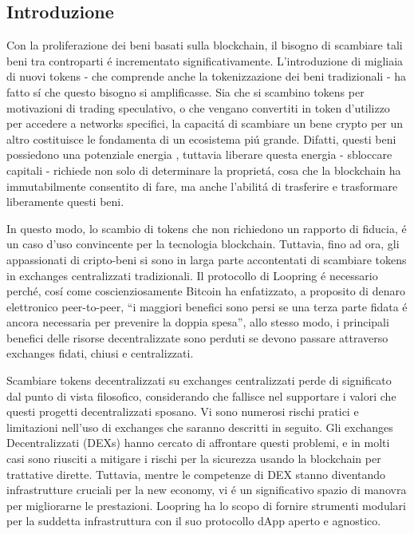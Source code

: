 \documentclass[UTF8,nofonts]{article}
\begin{document}
\begin{multicols}{2}
\section{Introduzione\label{sec:introduction}}

 Con la proliferazione dei beni  basati sulla blockchain, il bisogno di scambiare tali beni tra controparti \'e incrementato significativamente. L'introduzione di migliaia di nuovi tokens - che comprende anche la tokenizzazione dei beni tradizionali -  ha fatto s\'i che questo bisogno si amplificasse. Sia che si scambino tokens per motivazioni di trading speculativo, o che vengano convertiti in token d'utilizzo per accedere a networks specifici, la capacit\'a di scambiare un bene crypto per un altro costituisce le fondamenta di un ecosistema pi\'u grande. Difatti, questi beni  possiedono una potenziale energia \cite{desotocapital}, tuttavia liberare questa energia - sbloccare capitali - richiede non solo di determinare la propriet\'a, cosa che la blockchain ha immutabilmente consentito di fare, ma anche l'abilit\'a di trasferire e trasformare liberamente questi beni.

 In questo modo, lo scambio di tokens che non richiedono un rapporto di fiducia, \'e un caso d'uso convincente per la tecnologia blockchain. Tuttavia, fino ad ora, gli appassionati di cripto-beni si sono in larga parte accontentati di scambiare tokens in exchanges centralizzati tradizionali. Il protocollo di Loopring \'e necessario perch\'e, cos\'i come coscienziosamente Bitcoin \cite{nakamoto2008bitcoin} ha enfatizzato, a proposito di denaro elettronico peer-to-peer, \enquote{i maggiori benefici sono persi se una terza parte fidata \'e ancora necessaria per prevenire la doppia spesa}, allo stesso modo, i principali benefici delle risorse decentralizzate sono perduti se devono passare attraverso exchanges fidati, chiusi e centralizzati.

Scambiare tokens decentralizzati su exchanges centralizzati perde di significato dal punto di vista filosofico, considerando che fallisce nel supportare i valori che questi progetti decentralizzati sposano. Vi sono numerosi rischi pratici e limitazioni nell'uso di exchanges che saranno descritti in seguito. Gli exchanges Decentralizzati (DEXs) \cite{schuh2015bitshares} \cite{bancor} \cite{kyber} hanno cercato di affrontare questi problemi, e in molti casi sono riusciti a mitigare i rischi per la sicurezza usando la blockchain per trattative dirette. Tuttavia, mentre le competenze di DEX stanno diventando infrastrutture cruciali per la new economy, vi \'e un significativo spazio di manovra per migliorarne le prestazioni. Loopring ha lo scopo di fornire strumenti modulari per la suddetta infrastruttura con il suo  protocollo dApp aperto e agnostico.


\end{multicols}
\end{document}
